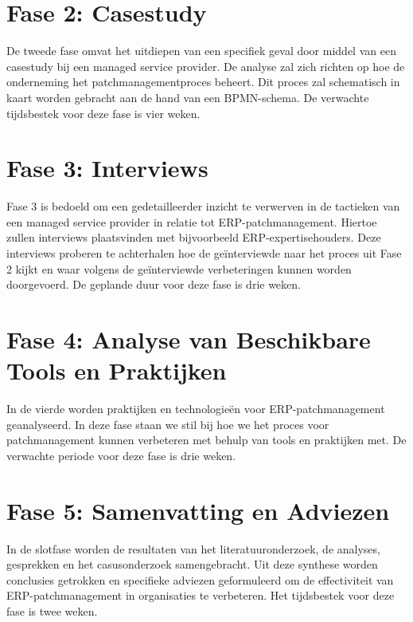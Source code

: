 \section{Fase 2: Casestudy}
De tweede fase omvat het uitdiepen van een specifiek geval door middel van een casestudy bij een managed service provider. De analyse zal zich richten op hoe de onderneming het patchmanagementproces beheert. Dit
proces zal schematisch in kaart worden gebracht aan de hand van een BPMN-schema. De verwachte tijdsbestek voor deze fase is vier weken.
\section{Fase 3: Interviews}
Fase 3 is bedoeld om een gedetailleerder inzicht te verwerven in de tactieken van een managed service provider in relatie tot ERP-patchmanagement. Hiertoe zullen interviews plaatsvinden met bijvoorbeeld ERP-expertisehouders. Deze 
interviews proberen te achterhalen hoe de geïnterviewde naar het proces uit Fase 2 kijkt en waar volgens de geïnterviewde verbeteringen kunnen worden doorgevoerd. De geplande duur voor deze fase is drie weken.
\section{Fase 4: Analyse van Beschikbare Tools en Praktijken}
In de vierde worden praktijken en technologieën voor ERP-patchmanagement geanalyseerd. In deze fase staan we stil bij hoe we het proces voor patchmanagement kunnen verbeteren met behulp van tools en praktijken met. De verwachte periode voor deze fase is drie weken.
\section{Fase 5: Samenvatting en Adviezen}
In de slotfase worden de resultaten van het literatuuronderzoek, de analyses, gesprekken en het casusonderzoek samengebracht. Uit deze synthese worden conclusies getrokken en specifieke adviezen geformuleerd om de effectiviteit 
van ERP-patchmanagement in organisaties te verbeteren. Het tijdsbestek voor deze fase is twee weken. \\


